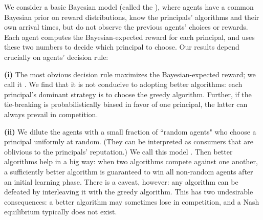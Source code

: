 

We consider a basic Bayesian model (called the \emph{\TheoryModel}), where agents have a common Bayesian prior on reward distributions, know the principals' algorithms and their own arrival times, but do not observe the previous agents' choices or rewards. Each agent computes the Bayesian-expected reward for each principal, and uses these two numbers to decide which principal to choose.
Our results depend crucially on agents' decision rule:

\textbf{(i)} The most obvious decision rule maximizes the Bayesian-expected reward; we call it \HardMax. We find that it is not conducive to adopting better algorithms: each principal's dominant strategy is to choose the greedy algorithm. Further,
if the tie-breaking is probabilistically biased in favor of one principal, the latter
can always prevail in competition.

\textbf{(ii)} We dilute the \HardMax agents with a small fraction of ``random agents" who choose a principal uniformly at random.
(They can be interpreted as consumers that are oblivious to the principals' reputation.) We call this model \HardMaxRandom. Then better algorithms help in a big way: when two algorithms compete against one another, a sufficiently better algorithm is guaranteed to win all non-random agents after an initial learning phase. There is a caveat, however: any algorithm can be defeated by interleaving it with the greedy algorithm. This has two undesirable consequences: a better algorithm may sometimes lose in competition, and a Nash equilibrium typically does not exist.

